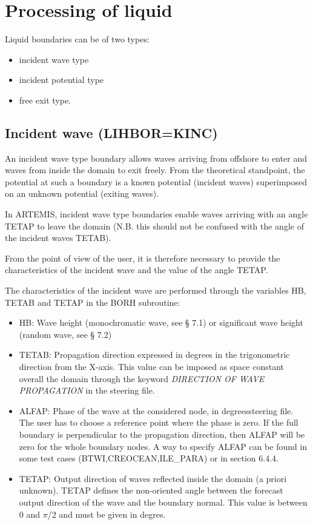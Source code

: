 \section{Processing of liquid}

Liquid boundaries can be of two types:

\begin{itemize}
\item  incident wave type

\item  incident potential type

\item  free exit type.
\end{itemize}


\subsection{Incident wave (LIHBOR=KINC)}

An incident wave type boundary allows waves arriving from offshore to enter and
waves from inside the domain to exit freely. From the theoretical standpoint,
the potential at such a boundary is a known potential (incident waves)
superimposed on an unknown potential (exiting waves).

In ARTEMIS, incident wave type boundaries enable waves arriving with an angle
TETAP to leave the domain (N.B. this should not be confused with the angle of
the incident waves TETAB).

From the point of view of the user, it is therefore necessary to provide the
characteristics of the incident wave and the value of the angle TETAP.

The characteristics of the incident wave are performed through the variables
HB, TETAB and TETAP in the BORH subroutine:

\begin{itemize}
\item HB: Wave height (monochromatic wave, see {\S} 7.1) or significant wave
  height (random wave, see {\S} 7.2)

\item TETAB: Propagation direction expressed in degrees in the trigonometric
  direction from the X-axis. This value can be imposed as space constant
  overall the domain through the keyword \textit{DIRECTION OF WAVE PROPAGATION}
  in the steering file.

\item ALFAP: Phase of the wave at the considered node, in degreessteering file.
  The user has to choose a reference point where the phase is zero. If the full
  boundary is perpendicular to the propagation direction, then ALFAP will be
  zero for the whole boundary nodes. A way to specify ALFAP can be found in
  some test cases (BTWI,CREOCEAN,ILE\_PARA) or in section 6.4.4.

\item TETAP: Output direction of waves reflected inside the domain (a priori
  unknown). TETAP defines the non-oriented angle between the forecast output
  direction of the wave and the boundary normal. This value is between 0 and
  $\pi$/2 and must be given in degres.
\end{itemize}

